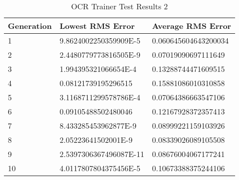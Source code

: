 \begin{center}
    \begin{longtable}{ | l | l | l |}
      \caption{OCR Trainer Test Results 2} \label{ocr2} \\
    \hline
  Generation & Lowest RMS Error & Average RMS Error \\ \hline
1 &	9.8624002250359909E-5 &	0.060645604643200034 \\ \hline
2 &	2.4480779773816505E-9 &	0.07019090697111649 \\ \hline
3 &	1.994395321066654E-4 &	0.13288744471609515 \\ \hline
4 &	0.08121739195296515 &	0.15881086010310858 \\ \hline
5 &	3.1168711299578786E-4	& 0.07064386663547106 \\ \hline
6 &	0.09105488502480046 &	0.12167928372357413 \\ \hline
7 &	8.433285453962877E-9 &	0.08999221159103926 \\ \hline
8 &	2.05223641502001E-9 &	0.08339026089105508 \\ \hline
9 &	2.5397306367496087E-11 &	0.08676004067177241 \\ \hline
10 & 4.0117807804375456E-5 &	0.10673388375244106 \\ \hline
\end{longtable}
\end{center}